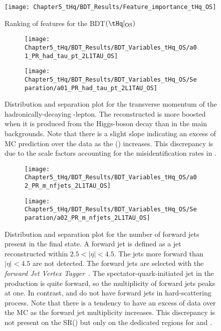 
\begin{figure}[h]
  \centering
  \texttt{[image: Chapter5\_tHq/BDT\_Results/Feature\_importance\_tHq\_OS]}
\caption{Ranking of features for the BDT$(\tHq|_{\text{OS}})$}
\label{fig:Appendix:BDTVARS:tHqOS:Feature_importance_tHq_OS}
\end{figure}


\begin{figure}[h]
\centering
\begin{subfigure}{.45\textwidth}
  \centering
  \texttt{[image: Chapter5\_tHq/BDT\_Results/BDT\_Variables\_tHq\_OS/a01\_PR\_had\_tau\_pt\_2L1TAU\_OS]}
\end{subfigure}%
\begin{subfigure}{.55\textwidth}
  \centering
  \texttt{[image: Chapter5\_tHq/BDT\_Results/BDT\_Variables\_tHq\_OS/Separation/a01\_PR\_had\_tau\_pt\_2L1TAU\_OS]}
\end{subfigure}
\caption{Distribution and separation plot for the transverse momentum of the hadronically-decaying \Ptau-lepton.
The reconstructed \tauhad is more boosted when it is produced from the Higgs-boson decay than in the main backgrounds.
Note that there is a slight slope indicating an excess of MC prediction over the data as the \pT(\tauhad) increases.
This discrepancy is due to the scale factors accounting for the misidentification rates in \ttbar.}
\label{fig:Appendix:BDTVARS:tHqOS:a01_PR_had_tau_pt}
\end{figure}

\begin{figure}[h]
\centering
\begin{subfigure}{.45\textwidth}
  \centering
  \texttt{[image: Chapter5\_tHq/BDT\_Results/BDT\_Variables\_tHq\_OS/a02\_PR\_m\_nfjets\_2L1TAU\_OS]}
\end{subfigure}%
\begin{subfigure}{.55\textwidth}
  \centering
  \texttt{[image: Chapter5\_tHq/BDT\_Results/BDT\_Variables\_tHq\_OS/Separation/a02\_PR\_m\_nfjets\_2L1TAU\_OS]}
\end{subfigure}
\caption{Distribution and separation plot for the number of forward jets present in the final state. A forward jet
is defined as a jet reconstructed within $2.5 < |\eta| < 4.5$.  The jets more forward than $|\eta| < 4.5$ are
not detected.
The forward jets are selected with the \textit{forward Jet Vertex Tagger}~\cite{ATLAS:2017ywy}.
The spectator-quark-initiated jet in the \tHq production is quite forward, so the multiplicity of forward jets peaks at one. 
In contrast, \ttbar and \Zjets do not have forward jets in hard-scattering process. 
Note that there is a tendency to have an excess of data over the MC as the forward jet multiplicity increases.
This discrepancy is not present on the SR(\tHq) but only on the dedicated regions for \ttbar and \Zjets.}
\label{fig:Appendix:BDTVARS:tHqOS:a02_PR_m_nfjets}
\end{figure}

